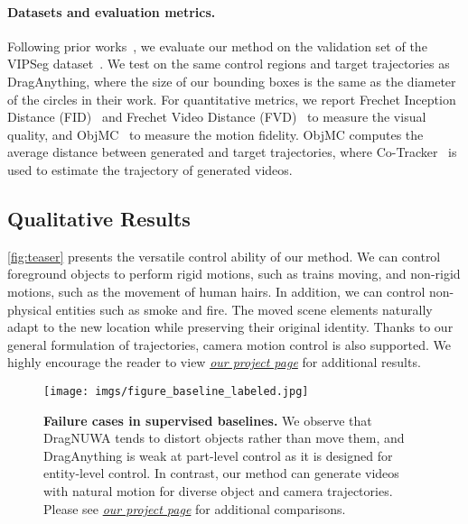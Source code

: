 \documentclass{article} \usepackage{iclr2025_conference,times}
\begin{document}
\vspace{-2.0mm}
\paragraph{Datasets and evaluation metrics.} 
Following prior works~\citep{wu2024draganything,zhou2024trackgo}, we evaluate our method on the validation set of the VIPSeg dataset~\citep{vipseg}.
We test on the same control regions and target trajectories as DragAnything, where the size of our bounding boxes is the same as the diameter of the circles in their work. For quantitative metrics, we report Frechet Inception Distance (FID)~\citep{FID} and Frechet Video Distance (FVD)~\citep{FVD} to measure the visual quality, and ObjMC~\citep{wu2024draganything} to measure the motion fidelity. ObjMC computes the average distance between generated and target trajectories, where Co-Tracker~\citep{cotracker} is used to estimate the trajectory of generated videos.


\vspace{-3mm}
\subsection{Qualitative Results}

\cref{fig:teaser} presents the versatile control ability of our method.
We can control foreground objects to perform rigid motions, such as trains moving, and non-rigid motions, such as the movement of human hairs.
In addition, we can control non-physical entities such as smoke and fire.
The moved scene elements naturally adapt to the new location while preserving their original identity.
Thanks to our general formulation of trajectories, camera motion control is also supported.
We highly encourage the reader to view \href{https://kmcode1.github.io/Projects/SG-I2V\#obj-motion-results}{\textit{our project page}} for additional results.

\begin{figure}[!t]
\centering
\texttt{[image: imgs/figure\_baseline\_labeled.jpg]}
\caption{\textbf{Failure cases in supervised baselines.}
We observe that DragNUWA tends to distort objects rather than move them, and DragAnything is weak at part-level control as it is designed for entity-level control. 
In contrast, our method can generate videos with natural motion for diverse object and camera trajectories.
Please see \href{https://kmcode1.github.io/Projects/SG-I2V\#baseline-comparison}{\textit{our project page}} for additional comparisons.}
\label{fig:results_baseline}
\vspace{-1.5mm}
\end{figure}
\end{document}
